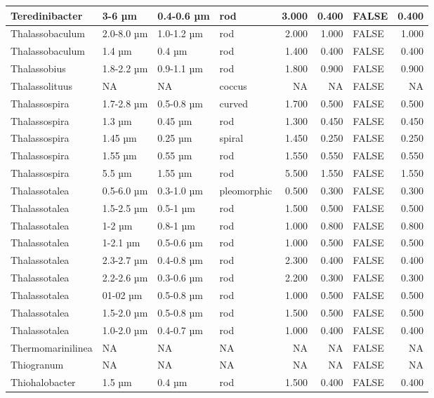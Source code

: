 \documentclass[
]{article}
\begin{document}
\begin{table}
\begin{tabular}{l|l|l|l|r|r|l|r}
\hline
Teredinibacter & 3-6 µm & 0.4-0.6 µm & rod & 3.000 & 0.400 & FALSE & 0.400\\
\hline
Thalassobaculum & 2.0-8.0 µm & 1.0-1.2 µm & rod & 2.000 & 1.000 & FALSE & 1.000\\
\hline
Thalassobaculum & 1.4 µm & 0.4 µm & rod & 1.400 & 0.400 & FALSE & 0.400\\
\hline
Thalassobius & 1.8-2.2 µm & 0.9-1.1 µm & rod & 1.800 & 0.900 & FALSE & 0.900\\
\hline
Thalassolituus & NA & NA & coccus & NA & NA & FALSE & NA\\
\hline
Thalassospira & 1.7-2.8 µm & 0.5-0.8 µm & curved & 1.700 & 0.500 & FALSE & 0.500\\
\hline
Thalassospira & 1.3 µm & 0.45 µm & rod & 1.300 & 0.450 & FALSE & 0.450\\
\hline
Thalassospira & 1.45 µm & 0.25 µm & spiral & 1.450 & 0.250 & FALSE & 0.250\\
\hline
Thalassospira & 1.55 µm & 0.55 µm & rod & 1.550 & 0.550 & FALSE & 0.550\\
\hline
Thalassospira & 5.5 µm & 1.55 µm & rod & 5.500 & 1.550 & FALSE & 1.550\\
\hline
Thalassotalea & 0.5-6.0 µm & 0.3-1.0 µm & pleomorphic & 0.500 & 0.300 & FALSE & 0.300\\
\hline
Thalassotalea & 1.5-2.5 µm & 0.5-1 µm & rod & 1.500 & 0.500 & FALSE & 0.500\\
\hline
Thalassotalea & 1-2 µm & 0.8-1 µm & rod & 1.000 & 0.800 & FALSE & 0.800\\
\hline
Thalassotalea & 1-2.1 µm & 0.5-0.6 µm & rod & 1.000 & 0.500 & FALSE & 0.500\\
\hline
Thalassotalea & 2.3-2.7 µm & 0.4-0.8 µm & rod & 2.300 & 0.400 & FALSE & 0.400\\
\hline
Thalassotalea & 2.2-2.6 µm & 0.3-0.6 µm & rod & 2.200 & 0.300 & FALSE & 0.300\\
\hline
Thalassotalea & 01-02 µm & 0.5-0.8 µm & rod & 1.000 & 0.500 & FALSE & 0.500\\
\hline
Thalassotalea & 1.5-2.0 µm & 0.5-0.8 µm & rod & 1.500 & 0.500 & FALSE & 0.500\\
\hline
Thalassotalea & 1.0-2.0 µm & 0.4-0.7 µm & rod & 1.000 & 0.400 & FALSE & 0.400\\
\hline
Thermomarinilinea & NA & NA & NA & NA & NA & FALSE & NA\\
\hline
Thiogranum & NA & NA & NA & NA & NA & FALSE & NA\\
\hline
Thiohalobacter & 1.5 µm & 0.4 µm & rod & 1.500 & 0.400 & FALSE & 0.400\\

\end{tabular}
\end{table}
\end{document}
